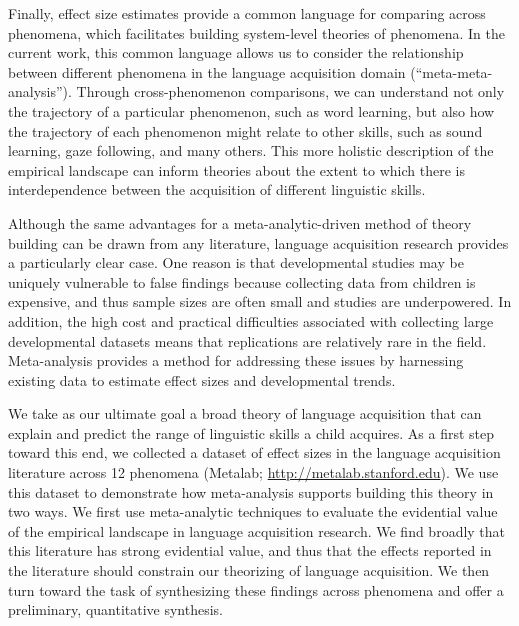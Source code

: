 \documentclass[english,floatsintext,man]{apa6}
\theoremstyle{definition}
\theoremstyle{definition}
\theoremstyle{remark}
\begin{document}
Finally, effect size estimates provide a common language for comparing
across phenomena, which facilitates building system-level theories of
phenomena. In the current work, this common language allows us to
consider the relationship between different phenomena in the language
acquisition domain (\enquote{meta-meta-analysis}). Through
cross-phenomenon comparisons, we can understand not only the trajectory
of a particular phenomenon, such as word learning, but also how the
trajectory of each phenomenon might relate to other skills, such as
sound learning, gaze following, and many others. This more holistic
description of the empirical landscape can inform theories about the
extent to which there is interdependence between the acquisition of
different linguistic skills.

Although the same advantages for a meta-analytic-driven method of theory
building can be drawn from any literature, language acquisition research
provides a particularly clear case. One reason is that developmental
studies may be uniquely vulnerable to false findings because collecting
data from children is expensive, and thus sample sizes are often small
and studies are underpowered. In addition, the high cost and practical
difficulties associated with collecting large developmental datasets
means that replications are relatively rare in the field. Meta-analysis
provides a method for addressing these issues by harnessing existing
data to estimate effect sizes and developmental trends.

We take as our ultimate goal a broad theory of language acquisition that
can explain and predict the range of linguistic skills a child acquires.
As a first step toward this end, we collected a dataset of effect sizes
in the language acquisition literature across 12 phenomena (Metalab;
\url{http://metalab.stanford.edu}). We use this dataset to demonstrate
how meta-analysis supports building this theory in two ways. We first
use meta-analytic techniques to evaluate the evidential value of the
empirical landscape in language acquisition research. We find broadly
that this literature has strong evidential value, and thus that the
effects reported in the literature should constrain our theorizing of
language acquisition. We then turn toward the task of synthesizing these
findings across phenomena and offer a preliminary, quantitative
synthesis.

\renewcommand{\arraystretch}{1.5}
\end{document}
